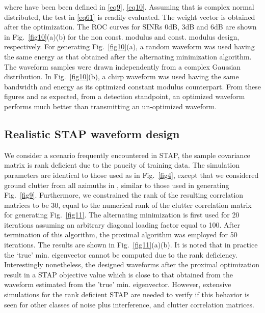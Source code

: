 \documentclass[11pt,draftclsnofoot,onecolumn]{IEEEtran}
\theoremstyle{definition}
\theoremstyle{remark}
\begin{document}
where   have been been defined in \eqref{eq9}, \eqref{eq10}. Assuming that  is complex normal distributed, the test in \eqref{eq61} is readily evaluated. The weight vector is obtained after the optimization. The ROC curves for SINRs 0dB, 3dB and 6dB are shown in Fig.~\ref{fig10}(a)(b) for the non const. modulus and const. modulus design, respectively. For generating Fig.~\ref{fig10}(a),  a random waveform was used having the same energy as that obtained after the alternating minimization algorithm. The waveform samples were drawn independently from a complex Gaussian distribution. In Fig.~\ref{fig10}(b), a chirp waveform was used having the same bandwidth and energy as its optimized constant modulus counterpart. From these figures and as expected, from a  detection standpoint, an optimized waveform performs much better than transmitting an un-optimized waveform. 
\subsection{Realistic STAP waveform design}
We consider  a scenario frequently encountered in STAP, the sample covariance matrix is rank deficient due to the paucity of training data. The simulation parameters are identical to those used as in Fig.~\ref{fig4}, except that we considered ground clutter from all azimuths in , similar to those used in generating Fig.~\ref{fig9}. Furthermore, we constrained the rank of the resulting correlation matrices to be 30, equal to the numerical rank of the clutter correlation matrix for generating Fig.~\ref{fig11}. The alternating minimization is first used for 20 iterations assuming an arbitrary diagonal loading factor equal to 100. After termination of this algorithm, the proximal algorithm was employed for 50 iterations. The results are shown in Fig.~\ref{fig11}(a)(b). It is noted that in practice the `true' min. eigenvector cannot be computed due to the rank deficiency. Interestingly nonetheless, the designed waveforms after the proximal optimization result in a STAP objective value which is close to that obtained from the waveform estimated from the 'true' min. eigenvector. However, extensive simulations for the rank deficient STAP are needed to verify if this behavior is seen for other classes of noise plus interference, and clutter correlation matrices. 
\end{document}
